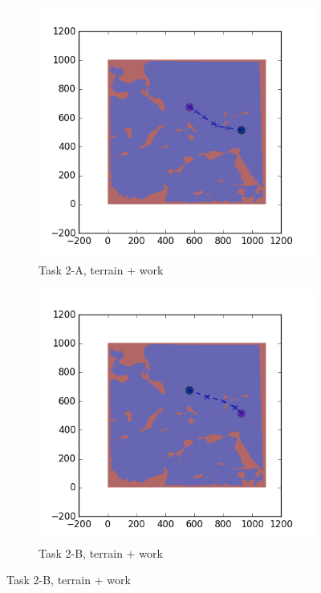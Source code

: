 \documentclass{tamuccthesis}
\begin{document}
\begin{figure}
    \begin{subfigure}[b]{0.4\textwidth}
        \centering
        \includegraphics[width=\textwidth,trim={4cm 3cm 2cm 3cm},clip]{EXP3RG_PathBa_-1_-1_-1_0.png}
        \caption{Task 2-A, terrain + work}
        \label{fig:Path_2-A_terrain_work}
    \end{subfigure}
    \hfill
    \begin{subfigure}[b]{0.4\textwidth}  
        \centering 
        \includegraphics[width=\textwidth,trim={4cm 3cm 2cm 3cm},clip]{EXP3RG_PathBb_-1_-1_-1_0.png}
        \caption{Task 2-B, terrain + work}   
        \label{fig:Path_2-B_terrain_work}
    \end{subfigure}


\end{figure}
\end{document}
